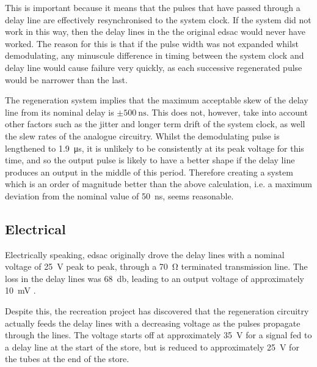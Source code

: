 This is important because it means that the pulses that have passed through a delay line are effectively resynchronised to the system clock. If the system did not work in this way, then the delay lines in the the original \gls{edsac} would never have worked. The reason for this is that if the pulse width was not expanded whilst demodulating, any minuscule difference in timing between the system clock and delay line would cause failure very quickly, as each successive regenerated pulse would be narrower than the last.

\newcommand{\maxJitterPlusSkewNs}{50} %

The regeneration system implies that the maximum acceptable skew of the delay line from its nominal delay is $\pm\SI{500}{\nano\second}$. This does not, however, take into account other factors such as the jitter and longer term drift of the system clock, as well the slew rates of the analogue circuitry. Whilst the demodulating pulse is lengthened to \SI{1.9}{\micro\second}, it is unlikely to be consistently at its peak voltage for this time, and so the output pulse is likely to have a better shape if the delay line produces an output in the middle of this period. Therefore creating a system which is an order of magnitude better than the above calculation, i.e. a maximum deviation from the nominal value of \SI{\maxJitterPlusSkewNs}{\nano\second}, seems reasonable.

\subsection{Electrical} \label{sec:review-delay-electrical}

\newcommand{\maxDelayInputV}{35}
\newcommand{\minDelayInputV}{25}

\newcommand{\maxDelayOutputmV}{100}
\newcommand{\minDelayOutputmV}{10}


Electrically speaking, \gls{edsac} originally drove the delay lines with a nominal voltage of \SI{25}{\volt} peak to peak, through a \SI{70}{\ohm} terminated transmission line. The loss in the delay lines was \SI{68}{\decibel}, leading to an output voltage of approximately \SI{10}{\milli\volt} \cite[p.212]{wilkes1948}.

Despite this, the recreation project has discovered that the regeneration circuitry actually feeds the delay lines with a decreasing voltage as the pulses propagate through the lines. The voltage starts off at approximately \SI{\maxDelayInputV}{\volt} for a signal fed to a delay line at the start of the store, but is reduced to approximately \SI{\minDelayInputV}{\volt} for the tubes at the end of the store.

